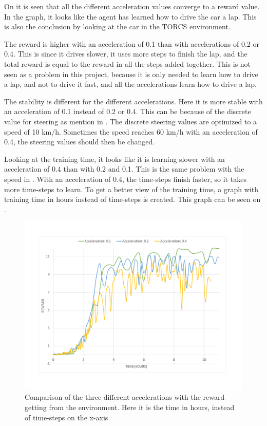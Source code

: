 On  it is seen that all the different acceleration values converge to a reward value. In the graph, it looks like the agent has learned how to drive the car a lap. This is also the conclusion by looking at the car in the TORCS environment. 

The reward is higher with an acceleration of 0.1 than with accelerations of 0.2 or 0.4. This is since it drives slower, it uses more steps to finish the lap, and the total reward is equal to the reward in all the steps added together. This is not seen as a problem in this project, because it is only needed to learn how to drive a lap, and not to drive it fast, and all the accelerations learn how to drive a lap.

The stability is different for the different accelerations. Here it is more stable with an acceleration of 0.1 instead of 0.2 or 0.4. This can be because of the discrete value for steering as mention in . The discrete steering values are optimized to a speed of 10 km/h. Sometimes the speed reaches 60 km/h with an acceleration of 0.4, the steering values should then be changed.  

Looking at the training time, it looks like it is learning slower with an acceleration of 0.4 than with 0.2 and 0.1. This is the same problem with the speed in . With an acceleration of 0.4, the time-steps finish faster, so it takes more time-steps to learn. To get a better view of the training time, a graph with training time in hours instead of time-steps is created. This graph can be seen on .       

\begin{figure}[H]
	\centering
	\includegraphics[width=1\textwidth]{Figures/Result/change_of_acceleration_new_reward_hours_graph.pdf}
	\caption{Comparison of the three different accelerations with the reward getting from the environment. Here it is the time in hours, instead of time-steps on the x-axis}
	\label{fig:change_of_acceleration_new_reward_hours_graph}
\end{figure}

